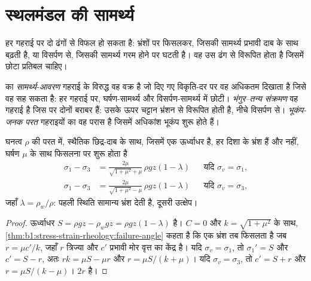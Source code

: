 \section{स्थलमंडल की सामर्थ्य}\label{sec:b1:stress-strain-rheology:envelope}

हर गहराई पर  दो ढंगों से विफल हो सकता है: भ्रंशों पर फिसलकर, जिसकी सामर्थ्य प्रभावी दाब के साथ बढ़ती है, या विसर्पण से, जिसकी सामर्थ्य गरम होने पर घटती है। वह उस ढंग से विरूपित होता है जिसमें छोटा प्रतिबल चाहिए।

\begin{definition}
\label{def:b1:stress-strain-rheology:strength-envelope}
 का \emph{सामर्थ्य-आवरण} गहराई के विरुद्ध वह वक्र है जो दिए गए विकृति-दर पर वह अधिकतम  दिखाता है जिसे वह सह सकता है: हर गहराई पर, घर्षण-सामर्थ्य और विसर्पण-सामर्थ्य में छोटी। \emph{भंगुर–तन्य संक्रमण} वह गहराई है जिस पर दोनों बराबर हैं: उसके ऊपर चट्टान भ्रंशन से विरूपित होती है, नीचे विसर्पण से। \emph{भूकंप-जनक परत} गहराइयों का वह परास है जिसमें अधिकांश भूकंप शुरू होते हैं।
\end{definition}

\begin{proposition}[गहराई के साथ घर्षण-सामर्थ्य]
\label{prop:b1:stress-strain-rheology:brittle-gradient}
घनत्व $\rho$ की परत में, स्थैतिक छिद्र-दाब के साथ, जिसमें एक  ऊर्ध्वाधर है, हर दिशा के भ्रंश हैं और  नहीं, घर्षण $\mu$ के साथ फिसलना  पर शुरू होता है
\begin{align*}
  \sigma_1 - \sigma_3 &= \frac{2\mu}{\sqrt{1+\mu^2} + \mu}\,\rho g z(1-\lambda)
  && \text{यदि $\sigma_v = \sigma_1$}, \\
  \sigma_1 - \sigma_3 &= \frac{2\mu}{\sqrt{1+\mu^2} - \mu}\,\rho g z(1-\lambda)
  && \text{यदि $\sigma_v = \sigma_3$},
\end{align*}
जहाँ $\lambda = \rho_w/\rho$: पहली स्थिति सामान्य भ्रंश देती है, दूसरी उत्क्षेप।
\end{proposition}

\begin{proof}
ऊर्ध्वाधर  $S = \rho g z - \rho_w g z = \rho g z(1-\lambda)$ है। $C = 0$ और $k = \sqrt{1+\mu^2}$ के साथ, \cref{thm:b1:stress-strain-rheology:failure-angle} कहता है कि एक भ्रंश तब फिसलता है जब $r = \mu c'/k$, जहाँ $r$ त्रिज्या और $c'$ प्रभावी मोर वृत्त का केंद्र है। यदि $\sigma_v = \sigma_1$, तो $\sigma_1' = S$ और $c' = S - r$, अतः $rk = \mu S - \mu r$ और $r = \mu S/(k+\mu)$। यदि $\sigma_v = \sigma_3$, तो $c' = S + r$ और $r = \mu S/(k-\mu)$।  $2r$ है।
\end{proof}

